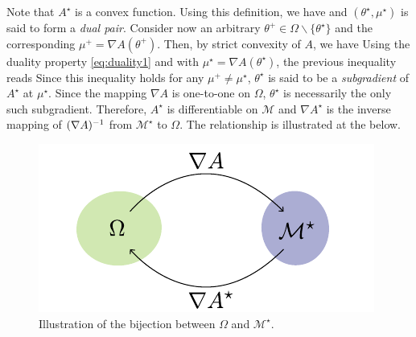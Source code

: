 Note that $A^{\star}$ is a convex function. Using this definition, we have
%
%
and $(\theta^{\star},\mu^{\star})$ is said to form a \emph{dual pair}. Consider now an arbitrary $\theta^{+}\in\Omega\backslash\{\theta^{\star}\}$ and the corresponding $\mu^{+}=\nabla A(\theta^{+})$. Then, by strict convexity of $A$, we have
%
%
Using the duality property \eqref{eq:duality1} and with $\mu^{\star}=\nabla A(\theta^{\star})$, the previous inequality reads
%
%
Since this inequality holds for any $\mu^{+}\neq \mu^{\star}$, $\theta^{\star}$ is said to be a \emph{subgradient} of $A^{\star}$ at $\mu^{\star}$. Since the mapping $\nabla A$ is one-to-one on $\Omega$, $\theta^{\star}$ is necessarily the only such subgradient. Therefore, $A^{\star}$ is differentiable on $\mathcal M$ \citep[theorem 25.1]{rockafellar70} and $\nabla A^{\star}$ is the inverse mapping of $(\nabla A)^{-1}$ from $\mathcal M^{\star}$ to $\Omega$. The relationship is illustrated at the  below.

\begin{figure}[!h]
	\center
	\includegraphics{figures/expf/mapping}
	\caption{\label{bijOmM}Illustration of the bijection between $\Omega$ and $\mathcal M^{\star}$.}
\end{figure}

